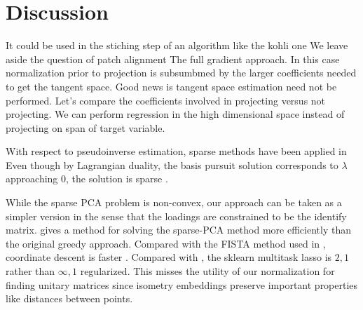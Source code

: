 \section{Discussion}
\label{sec:discussion}



It could be used in the stiching step of an algorithm like the kohli one
We leave aside the question of patch alignment 
The full gradient approach.
In this case normalization prior to projection is subsumbmed by the larger coefficients needed to get the tangent space.
Good news is tangent space estimation need not be performed.
Let's compare the coefficients involved in projecting versus not projecting.
We can perform regression in the high dimensional space instead of projecting on span of target variable.

With respect to pseudoinverse estimation, sparse methods have been applied in \cite{Sun2012-vp}
Even though by Lagrangian duality, the basis pursuit solution corresponds to $\lambda$ approaching $0$, the solution is sparse \cite{Tropp04-ju}.


While the sparse PCA problem is non-convex, our approach can be taken as a simpler version in the sense that the loadings are constrained to be the identify matrix.
\cite{Bertsimas2022-qo} gives a method for solving the sparse-PCA method more efficiently than the original greedy approach.
Compared with the FISTA method used in  \cite{Koelle2022-ju, Koelle2024-no}, coordinate descent \cite{Friedman-2007-yb, Meier2008-ts, Qin2013-tx} is faster \cite{Catalina2018-ek, Zhao2023-xn}.
Compared with \cite{Tropp06-sg, Liu2009-yo}, the sklearn multitask lasso is $2,1$ rather than $\infty,1$ regularized.
This misses the utility of our normalization for finding unitary matrices since isometry embeddings preserve important properties like distances between points.

